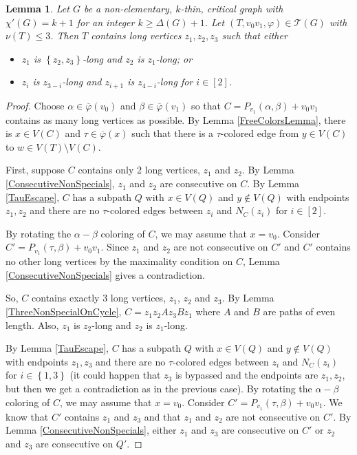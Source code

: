 \documentclass[12pt]{amsart}
\theoremstyle{plain}
\newtheorem{lem}[thm]{Lemma}
\theoremstyle{definition}
\theoremstyle{remark}
\newcommand{\fancy}[1]{\mathcal{#1}}
\newcommand{\T}{\fancy{T}}
\newcommand{\set}[1]{\left\{ #1 \right\}}
\newcommand{\irange}[1]{\left[#1\right]}
\newcommand{\vph}{\varphi}
\newcommand{\vphn}{\overline{\varphi}}
\begin{document}
\begin{lem}\label{MasterHelper}
Let $G$ be a non-elementary, $k$-thin, critical graph with $\chi'(G) = k+1$ for an integer $k \ge \Delta(G) + 1$.
Let $(T, v_0v_1, \vph) \in \T(G)$ with $\nu(T) \le 3$.   Then $T$ contains long vertices $z_1,z_2,z_3$ such that either 
\begin{itemize}
\item $z_1$ is $\set{z_2,z_3}$-long and $z_2$ is $z_1$-long; or
\item $z_i$ is $z_{3-i}$-long and $z_{i+1}$ is $z_{4-i}$-long for $i \in \irange{2}$.
\end{itemize}
\end{lem}
\begin{proof}
Choose $\alpha \in \vphn(v_0)$ and $\beta \in \vphn(v_1)$ so that $C = P_{v_1}(\alpha, \beta) + v_0v_1$ contains as many long vertices as possible. 
By Lemma \ref{FreeColorsLemma}, there is $x \in V(C)$ and $\tau \in \vphn(x)$ such that there is a $\tau$-colored edge from $y \in V(C)$ to $w \in V(T) \setminus V(C)$.

First, suppose $C$ contains only 2 long vertices, $z_1$ and $z_2$.  By Lemma \ref{ConsecutiveNonSpecials}, $z_1$ and $z_2$ are consecutive on $C$.
By Lemma \ref{TauEscape}, $C$ has a subpath $Q$ with $x \in V(Q)$ and $y \not \in V(Q)$ with endpoints $z_1,z_2$ and there are no 
$\tau$-colored edges between $z_i$ and $N_C(z_i)$ for $i \in \irange{2}$.  

By rotating the $\alpha-\beta$ coloring of $C$, we may assume that $x = v_0$. Consider $C' = P_{v_1}(\tau, \beta) + v_0v_1$.  Since $z_1$ and $z_2$ are not consecutive on $C'$ and
$C'$ contains no other long vertices by the maximality condition on $C$, Lemma \ref{ConsecutiveNonSpecials} gives a contradiction.

So, $C$ contains exactly 3 long vertices, $z_1$, $z_2$ and $z_3$.  By Lemma \ref{ThreeNonSpecialOnCycle}, $C = z_1z_2Az_3Bz_1$ where $A$ and $B$ are paths of even length.  Also,
$z_1$ is $z_2$-long and $z_2$ is $z_1$-long.  

By Lemma \ref{TauEscape}, $C$ has a subpath $Q$ with $x \in V(Q)$ and $y \not \in V(Q)$ with endpoints $z_1,z_3$ and there are no 
$\tau$-colored edges between $z_i$ and $N_C(z_i)$ for $i \in \set{1,3}$ (it could happen that $z_3$ is bypassed and the endpoints are $z_1, z_2$, but then we get a contradiction as in the previous case).
By rotating the $\alpha-\beta$ coloring of $C$, we may assume that $x = v_0$.  
Consider $C' = P_{v_1}(\tau, \beta) + v_0v_1$.  We know that $C'$ contains $z_1$ and $z_3$ and that $z_1$ and $z_2$ are not consecutive on $C'$.  By Lemma \ref{ConsecutiveNonSpecials}, either $z_1$ and $z_3$ are consecutive on 
$C'$ or $z_2$ and $z_3$ are consecutive on $Q'$.


\end{proof}
\end{document}
